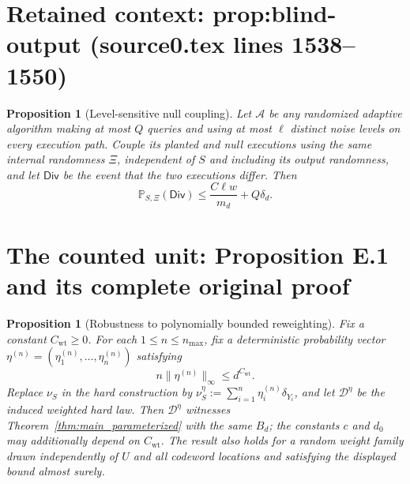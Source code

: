 \documentclass[10pt,a4paper]{amsart}
\newcommand{\Prob}{\mathbb P}
\theoremstyle{plain}
\newtheorem{proposition}[theorem]{Proposition}
\theoremstyle{definition}
\theoremstyle{remark}
\begin{document}
\section*{Retained context: prop:blind-output (source0.tex lines 1538--1550)}

\begin{proposition}[Level-sensitive null coupling]
\label{prop:blind-output}
Let \(\mathcal A\) be any randomized adaptive algorithm making at most
\(Q\) queries and using at most \(\ell\) distinct noise levels on every execution
path.  Couple its planted and null executions using the same internal
randomness \(\Xi\), independent of \(S\) and including its output
randomness, and let \(\mathsf{Div}\) be the event that the two executions
differ.  Then
\[
   \Prob_{S,\Xi}(\mathsf{Div})
   \le\frac{C\ell w}{m_d}+Q\delta_d.
\]
\end{proposition}


\section{The counted unit: Proposition E.1 and its complete original proof}

\begin{proposition}[Robustness to polynomially bounded reweighting]
\label{prop:bounded-reweighting}
Fix a constant \(C_{\mathrm{wt}}\ge0\).  For each
\(1\le n\le n_{\max}\), fix a deterministic probability vector
\(\eta^{(n)}=(\eta^{(n)}_1,\ldots,\eta^{(n)}_n)\) satisfying
\[
   n\|\eta^{(n)}\|_\infty\le d^{C_{\mathrm{wt}}}.
\]
Replace \(\nu_S\) in the hard construction by
\(\nu^\eta_S:=\sum_{i=1}^n\eta^{(n)}_i\delta_{Y_i}\), and let
\(\mathcal D^\eta\) be the induced weighted hard law.  Then
\(\mathcal D^\eta\) witnesses Theorem~\ref{thm:main_parameterized}
with the same \(B_d\); the constants \(c\) and \(d_0\) may additionally
depend on \(C_{\mathrm{wt}}\).  The result also holds for a random
weight family drawn independently of \(U\) and all codeword locations
and satisfying the
displayed bound almost surely.
\end{proposition}
\end{document}
